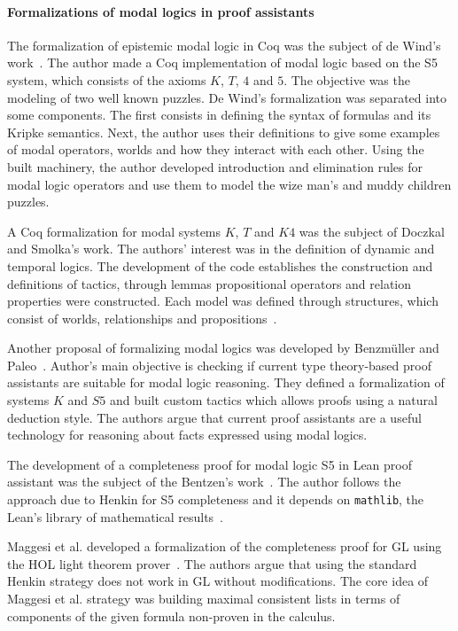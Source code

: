\documentclass[sigconf]{acmart}
\begin{document}
\paragraph{Formalizations of modal logics in proof assistants}

The formalization of epistemic modal logic in Coq was the subject of de Wind's
work~\cite{dewind}.
The author made a Coq implementation of modal logic based on the S5 system,
which consists of  the axioms $K$, $T$, $4$ and $5$. The objective was the
modeling of two well known puzzles.
De Wind's formalization was separated into some components. The first consists in
defining the syntax of formulas and its Kripke semantics. Next, the author uses
their definitions to give some examples of modal operators, worlds and how they
interact with each other. Using the built machinery, the author developed
introduction and elimination rules for modal logic operators and use them to
model the wize man's and muddy children puzzles.

A Coq formalization for modal systems $K$, $T$ and $K4$ was the subject of 
Doczkal and Smolka's work. The authors' interest was in the definition of dynamic
and temporal logics. The development of the code establishes the construction
and definitions of tactics, through lemmas propositional operators and relation
properties were constructed. Each model was defined through structures, which
consist of worlds, relationships and propositions~\cite{saarland}.

Another proposal of formalizing modal logics was developed by Benzmüller and
Paleo~\cite{Chris_Bruno}. Author's main objective is checking if current
type theory-based proof assistants are suitable for modal logic reasoning.
They defined a formalization of systems $K$ and $S5$ and built custom tactics
which allows proofs using a natural deduction style.
The authors argue that current proof assistants are a useful technology for
reasoning about facts expressed using modal logics. 

The development of a completeness proof for modal logic S5 in Lean proof
assistant was the subject of the Bentzen's work~\cite{Bentzen2021}. The author
follows the approach due to Henkin for S5 completeness and it depends on
\texttt{mathlib}, the Lean's library of mathematical results~\cite{mathlib20}. 

Maggesi et al. developed a formalization of the completeness proof for GL using
the HOL light theorem prover~\cite{Maggesi21}. The authors argue that using the
standard Henkin strategy does not work in GL without modifications. The core idea of
Maggesi et al. strategy was building maximal consistent lists in terms of
components of the given formula non-proven in the calculus.
\end{document}
